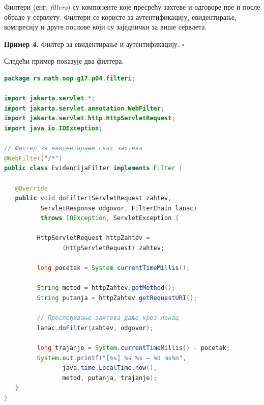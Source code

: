 Филтери (енг. \textit{filters}) су компоненте које пресрећу захтеве и одговоре пре и после обраде у сервлету. Филтери се користе за аутентификацију, евидентирање, компресију и друге послове који су заједнички за више сервлета.


\bigskip

\noindent \textbf{Пример 4.} Филтер за евидентирање и аутентификацију. $\square$

\medskip

Следећи пример показује два филтера:


\begin{lstlisting}[language=Java]
package rs.math.oop.g17.p04.filteri;
 
import jakarta.servlet.*;
import jakarta.servlet.annotation.WebFilter;
import jakarta.servlet.http.HttpServletRequest;
import java.io.IOException;
 
// Филтер за евидентирање свих захтева
@WebFilter("/*")
public class EvidencijaFilter implements Filter {
 
   @Override
   public void doFilter(ServletRequest zahtev,
          ServletResponse odgovor, FilterChain lanac)
          throws IOException, ServletException {
 
         HttpServletRequest httpZahtev =
                (HttpServletRequest) zahtev;
 
         long pocetak = System.currentTimeMillis();
 
         String metod = httpZahtev.getMethod();
         String putanja = httpZahtev.getRequestURI();
 
         // Прослеђивање захтева даље кроз ланац
         lanac.doFilter(zahtev, odgovor);
 
         long trajanje = System.currentTimeMillis() - pocetak;
         System.out.printf("[%s] %s %s – %d ms%n",
                java.time.LocalTime.now(),
                metod, putanja, trajanje);
   }
}
\end{lstlisting}


